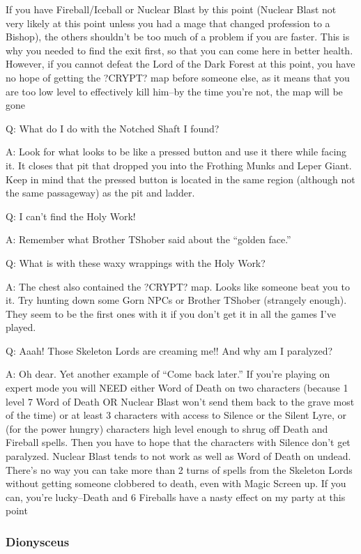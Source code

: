 \documentclass[12pt]{article}
\begin{document}
If you have Fireball/Iceball or Nuclear Blast by this point (Nuclear
Blast not very likely at this point unless you had a mage that changed
profession to a Bishop), the others shouldn't be too much of a problem
if you are faster. This is why you needed to find the exit first, so
that you can come here in better health. However, if you cannot defeat
the Lord of the Dark Forest at this point, you have no hope of getting
the ?CRYPT? map before someone else, as it means that you are too low
level to effectively kill him--by the time you're not, the map will be
gone

Q: What do I do with the Notched Shaft I found?

A: Look for what looks to be like a pressed button and use it there
while facing it. It closes that pit that dropped you into the Frothing
Munks and Leper Giant. Keep in mind that the pressed button is located
in the same region (although not the same passageway) as the pit and
ladder.

Q: I can't find the Holy Work!

A: Remember what Brother TShober said about the ``golden face.''

Q: What is with these waxy wrappings with the Holy Work?

A: The chest also contained the ?CRYPT? map. Looks like someone beat you
to it. Try hunting down some Gorn NPCs or Brother TShober (strangely
enough). They seem to be the first ones with it if you don't get it in
all the games I've played.

Q: Aaah! Those Skeleton Lords are creaming me!! And why am I paralyzed?

A: Oh dear. Yet another example of ``Come back later.'' If you're
playing on expert mode you will NEED either Word of Death on two
characters (because 1 level 7 Word of Death OR Nuclear Blast won't send
them back to the grave most of the time) or at least 3 characters with
access to Silence or the Silent Lyre, or (for the power hungry)
characters high level enough to shrug off Death and Fireball spells.
Then you have to hope that the characters with Silence don't get
paralyzed. Nuclear Blast tends to not work as well as Word of Death on
undead. There's no way you can take more than 2 turns of spells from the
Skeleton Lords without getting someone clobbered to death, even with
Magic Screen up. If you can, you're lucky--Death and 6 Fireballs have a
nasty effect on my party at this point

\subsubsection{Dionysceus}\label{dionysceus}
\end{document}
